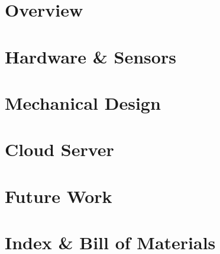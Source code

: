 \documentclass[12pt,a4paper]{article}
\begin{document}
\section{Overview}

\newpage
\section{Hardware \& Sensors}


\newpage
\section{Mechanical Design}


\newpage
\section{Cloud Server}


\newpage
\section{Future Work}



\newpage
\section{Index \& Bill of Materials}

\end{document}

